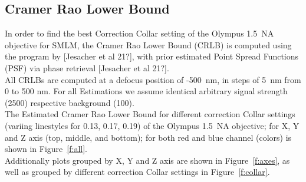 \documentclass[11pt, a4paper, oneside, twocolumn]{report}
\begin{document}
\clearpage\subsection{Cramer Rao Lower Bound}

In order to find the best Correction Collar setting of the Olympus
1.5~NA objective for SMLM, the Cramer Rao Lower Bound (CRLB) is
computed using the program by [Jesacher et al 21?], with prior
estimated Point Spread Functions (PSF) via phase retrieval [Jesacher
et al 21?].\\

All CRLBs are computed at a defocus position of -500~nm, in steps of
5~nm from 0 to 500 nm. For all Estimations we assume identical
arbitrary signal strength (2500) respective background (100).\\

The Estimated Cramer Rao Lower Bound for different correction Collar
settings (variing linestyles for 0.13, 0.17, 0.19) of the Olympus
1.5~NA objective; for X, Y and Z axis (top, middle, and bottom); for
both red and blue channel (colors) is shown in
Figure~\ref{f:all}.\\

Additionally plots grouped by X, Y and Z axis are shown in
Figure~\ref{f:axes}, as well as grouped by different correction Collar
settings in Figure~\ref{f:collar}.\\
\end{document}
